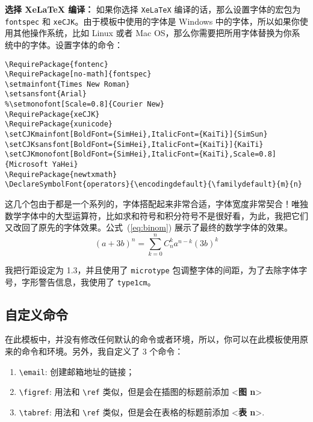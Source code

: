 \documentclass[lang=cn]{elegantpaper}
\begin{document}
\noindent\textbf{选择 XeLaTeX 编译：}
如果你选择 \lstinline{XeLaTeX} 编译的话，那么设置字体的宏包为 \lstinline{fontspec} 和 \lstinline{xeCJK}。由于模板中使用的字体是 Windows 中的字体，所以如果你使用其他操作系统，比如 Linux 或者 Mac OS，那么你需要把所用字体替换为你系统中的字体。设置字体的命令：

\begin{lstlisting}
\RequirePackage{fontenc}
\RequirePackage[no-math]{fontspec}
\setmainfont{Times New Roman}
\setsansfont{Arial}
%\setmonofont[Scale=0.8]{Courier New}
\RequirePackage{xeCJK}
\RequirePackage{xunicode}
\setCJKmainfont[BoldFont={SimHei},ItalicFont={KaiTi}]{SimSun}
\setCJKsansfont[BoldFont={SimHei},ItalicFont={KaiTi}]{KaiTi}
\setCJKmonofont[BoldFont={SimHei},ItalicFont={KaiTi},Scale=0.8]{Microsoft YaHei}
\RequirePackage{newtxmath}
\DeclareSymbolFont{operators}{\encodingdefault}{\familydefault}{m}{n}
\end{lstlisting}

这几个包由于都是一个系列的，字体搭配起来非常合适，字体宽度非常契合！唯独数学字体中的大型运算符，比如求和符号和积分符号不是很好看，为此，我把它们又改回了原先的字体效果。公式~(\ref{eq:binom}) 展示了最终的数学字体的效果。
\begin{equation}
(a+3b)^{n} = \sum_{k=0}^{n} C_{n}^{k} a^{n-k} (3b)^k  \label{eq:binom}
\end{equation}

我把行距设定为 1.3，并且使用了 \lstinline{microtype} 包调整字体的间距，为了去除字体字号，字形警告信息，我使用了 \lstinline{type1cm}。


\subsection{自定义命令}
在此模板中，并没有修改任何默认的命令或者环境，所以，你可以在此模板使用原来的命令和环境。另外，我自定义了 3 个命令：

\begin{enumerate}
	\item \lstinline{\email}: 创建邮箱地址的链接；
	\item \lstinline{\figref}: 用法和 \lstinline{\ref} 类似，但是会在插图的标题前添加 <\textbf{图 n}> 
	\item \lstinline{\tabref}: 用法和 \lstinline{\ref} 类似，但是会在表格的标题前添加 <\textbf{表 n}>.
\end{enumerate}{}
\end{document}
